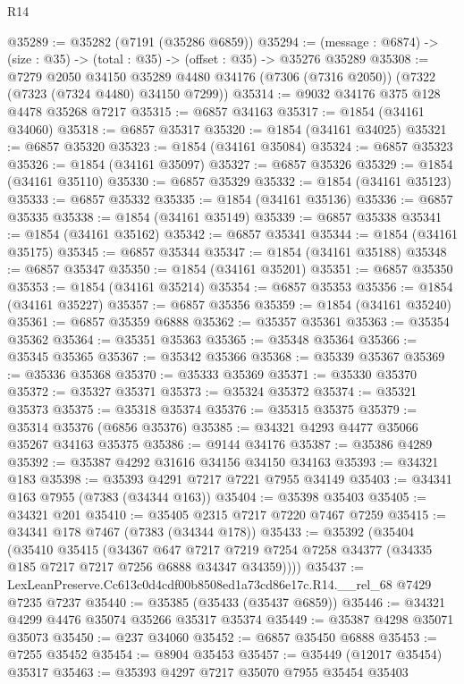 \begin{lexlean}{R14}
\begin{coremodule}
@35289 := @35282 (@7191 (@35286 @6859))
@35294 := (message : @6874) -> (size : @35) -> (total : @35) -> (offset : @35) -> @35276 @35289
@35308 := @7279
    @2050
    @34150
    @35289
    @4480
    @34176
    (@7306 (@7316 @2050))
    (@7322 (@7323 (@7324 @4480) @34150 @7299))
@35314 := @9032 @34176 @375 @128 @4478 @35268 @7217
@35315 := @6857 @34163
@35317 := @1854 (@34161 @34060)
@35318 := @6857 @35317
@35320 := @1854 (@34161 @34025)
@35321 := @6857 @35320
@35323 := @1854 (@34161 @35084)
@35324 := @6857 @35323
@35326 := @1854 (@34161 @35097)
@35327 := @6857 @35326
@35329 := @1854 (@34161 @35110)
@35330 := @6857 @35329
@35332 := @1854 (@34161 @35123)
@35333 := @6857 @35332
@35335 := @1854 (@34161 @35136)
@35336 := @6857 @35335
@35338 := @1854 (@34161 @35149)
@35339 := @6857 @35338
@35341 := @1854 (@34161 @35162)
@35342 := @6857 @35341
@35344 := @1854 (@34161 @35175)
@35345 := @6857 @35344
@35347 := @1854 (@34161 @35188)
@35348 := @6857 @35347
@35350 := @1854 (@34161 @35201)
@35351 := @6857 @35350
@35353 := @1854 (@34161 @35214)
@35354 := @6857 @35353
@35356 := @1854 (@34161 @35227)
@35357 := @6857 @35356
@35359 := @1854 (@34161 @35240)
@35361 := @6857 @35359 @6888
@35362 := @35357 @35361
@35363 := @35354 @35362
@35364 := @35351 @35363
@35365 := @35348 @35364
@35366 := @35345 @35365
@35367 := @35342 @35366
@35368 := @35339 @35367
@35369 := @35336 @35368
@35370 := @35333 @35369
@35371 := @35330 @35370
@35372 := @35327 @35371
@35373 := @35324 @35372
@35374 := @35321 @35373
@35375 := @35318 @35374
@35376 := @35315 @35375
@35379 := @35314 @35376 (@6856 @35376)
@35385 := @34321 @4293 @4477 @35066 @35267 @34163 @35375
@35386 := @9144 @34176
@35387 := @35386 @4289
@35392 := @35387 @4292 @31616 @34156 @34150 @34163
@35393 := @34321 @183
@35398 := @35393 @4291 @7217 @7221 @7955 @34149
@35403 := @34341 @163 @7955 (@7383 (@34344 @163))
@35404 := @35398 @35403
@35405 := @34321 @201
@35410 := @35405 @2315 @7217 @7220 @7467 @7259
@35415 := @34341 @178 @7467 (@7383 (@34344 @178))
@35433 := @35392
    (@35404
      (@35410
        @35415
        (@34367
          @647
          @7217
          @7219
          @7254
          @7258
          @34377
          (@34335 @185 @7217 @7217 @7256 @6888 @34347 @34359))))
@35437 := LexLeanPreserve.Cc613c0d4cdf00b8508ed1a73cd86e17c.R14.__rel_68 @7429 @7235 @7237
@35440 := @35385 (@35433 (@35437 @6859))
@35446 := @34321 @4299 @4476 @35074 @35266 @35317 @35374
@35449 := @35387 @4298 @35071 @35073
@35450 := @237 @34060
@35452 := @6857 @35450 @6888
@35453 := @7255 @35452
@35454 := @8904 @35453
@35457 := @35449 (@12017 @35454) @35317
@35463 := @35393 @4297 @7217 @35070 @7955 @35454 @35403

\end{coremodule}
\end{lexlean}
